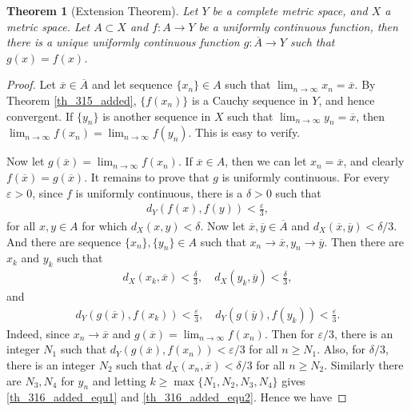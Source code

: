 \documentclass[10pt]{book}
\newtheorem{theorem}{Theorem}[chapter]
\theoremstyle{definition}
\numberwithin{equation}{chapter}
\begin{document}
\begin{theorem}[Extension Theorem]\label{th_316_added}
Let $Y$ be a complete metric space, and $X$ a metric space. Let $A \subset X$ and $f: A \to Y$ be a uniformly continuous function, then there is a unique uniformly continuous function $g: \overline{A} \to Y$ such that $g(x) = f(x)$.
\end{theorem}
\begin{proof}
Let $\overline{x} \in \overline{A}$ and let sequence $\{x_n\} \in A$ such that $\lim_{n\to\infty} x_n = \overline{x}$. By Theorem \ref{th_315_added}, $\{f(x_n)\}$ is a Cauchy sequence in $Y$, and hence convergent. If $\{y_n\}$ is another sequence in $X$ such that $\lim_{n\to\infty} y_n = \overline{x}$, then $\lim_{n\to\infty} f(x_n) = \lim_{n\to\infty} f(y_n)$. This is easy to verify.

Now let $g(\overline{x}) = \lim_{n\to\infty} f(x_n)$. If $\overline{x} \in A$, then we can let $x_n = \overline{x}$, and clearly $f(\overline{x}) = g(\overline{x})$. It remains to prove that $g$ is uniformly continuous. For every $\varepsilon > 0$, since $f$ is uniformly continuous, there is a $\delta > 0$ such that 
\begin{align*}
    d_Y(f(x),f(y)) < \frac{\varepsilon}{3},
\end{align*}
for all $x,y \in A$ for which $d_X(x,y) < \delta$. Now let $\overline{x}, \overline{y} \in \overline{A}$ and $d_X(\overline{x}, \overline{y}) < \delta/3$. And there are sequence $\{x_n\}, \{y_n\} \in A$ such that $x_n \to \overline{x}, y_n \to \overline{y}$. Then there are $x_k$ and $y_k$ such that
\begin{align}\label{th_316_added_equ1}
    d_X(x_k,\overline{x}) < \frac{\delta}{3}, \quad d_X(y_k,\overline{y}) < \frac{\delta}{3}, 
\end{align}
and 
\begin{align}\label{th_316_added_equ2}
    d_Y(g(\overline{x}),f(x_k)) < \frac{\varepsilon}{3}, \quad d_Y(g(\overline{y}),f(y_k)) < \frac{\varepsilon}{3}.
\end{align}
Indeed, since $x_n \to \overline{x}$ and $g(\overline{x}) = \lim_{n\to\infty} f(x_n)$. Then for $\varepsilon/3$, there is an integer $N_1$ such that $d_Y(g(\overline{x}), f(x_n)) < \varepsilon/3$ for all $n \geq N_1$. Also, for $\delta/3$, there is an integer $N_2$ such that $d_X(x_n, \overline{x}) < \delta/3$ for all $n \geq N_2$. Similarly there are $N_3, N_4$ for $y_n$ and letting $k \geq \max\{N_1, N_2, N_3, N_4\}$ gives \eqref{th_316_added_equ1} and \eqref{th_316_added_equ2}. Hence we have

\end{proof}
\end{document}
